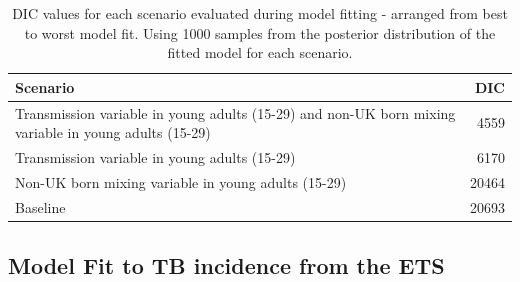 \documentclass[11pt,twoside]{bristolthesis}
\begin{document}
  \newpage
  \begin{longtable}{>{\raggedright\arraybackslash}p{10cm}r}
  \caption{\label{tab:09-scenarios-table}DIC values for each scenario evaluated during model fitting - arranged from best to worst model fit. Using 1000 samples from the posterior distribution of the fitted model for each scenario.}\\
  \toprule
  Scenario & DIC\\
  \midrule
  Transmission variable in young adults (15-29) and non-UK born mixing variable in young adults (15-29) & 4559\\
  Transmission variable in young adults (15-29) & 6170\\
  Non-UK born mixing variable in young adults (15-29) & 20464\\
  Baseline & 20693\\
  \bottomrule
  \end{longtable}
  \hypertarget{model-fit-to-tb-incidence-from-the-ets}{%
  \subsection{Model Fit to TB incidence from the ETS}\label{model-fit-to-tb-incidence-from-the-ets}}
  
\end{document}
